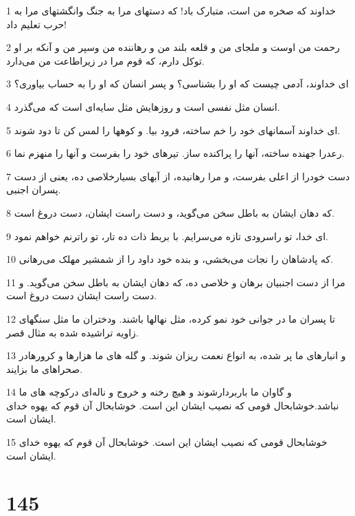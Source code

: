 \par 1 خداوند که صخره من است، متبارک باد! که دستهای مرا به جنگ وانگشتهای مرا به حرب تعلیم داد!
\par 2 رحمت من اوست و ملجای من و قلعه بلند من و رهاننده من وسپر من و آنکه بر او توکل دارم، که قوم مرا در زیراطاعت من می‌دارد.
\par 3 ‌ای خداوند، آدمی چیست که او را بشناسی؟ و پسر انسان که او را به حساب بیاوری؟
\par 4 انسان مثل نفسی است و روزهایش مثل سایه‌ای است که می‌گذرد.
\par 5 ‌ای خداوند آسمانهای خود را خم ساخته، فرود بیا. و کوهها را لمس کن تا دود شوند.
\par 6 رعدرا جهنده ساخته، آنها را پراکنده ساز. تیرهای خود را بفرست و آنها را منهزم نما.
\par 7 دست خودرا از اعلی بفرست، و مرا رهانیده، از آبهای بسیارخلاصی ده، یعنی از دست پسران اجنبی.
\par 8 که دهان ایشان به باطل سخن می‌گوید، و دست راست ایشان، دست دروغ است.
\par 9 ‌ای خدا، تو راسرودی تازه می‌سرایم. با بربط ذات ده تار، تو راترنم خواهم نمود.
\par 10 که پادشاهان را نجات می‌بخشی، و بنده خود داود را از شمشیر مهلک می‌رهانی.
\par 11 مرا از دست اجنبیان برهان و خلاصی ده، که دهان ایشان به باطل سخن می‌گوید. و دست راست ایشان دست دروغ است.
\par 12 تا پسران ما در جوانی خود نمو کرده، مثل نهالها باشند. ودختران ما مثل سنگهای زاویه تراشیده شده به مثال قصر.
\par 13 و انبارهای ما پر شده، به انواع نعمت ریزان شوند. و گله های ما هزارها و کرورهادر صحراهای ما بزایند.
\par 14 و گاوان ما باربردارشوند و هیچ رخنه و خروج و ناله‌ای درکوچه های ما نباشد.خوشابحال قومی که نصیب ایشان این است. خوشابحال آن قوم که یهوه خدای ایشان است.
\par 15 خوشابحال قومی که نصیب ایشان این است. خوشابحال آن قوم که یهوه خدای ایشان است.
 
\chapter{145}

